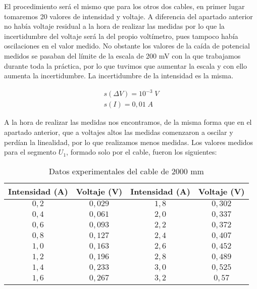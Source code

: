 \documentclass[a4paper,12pt,titlepage]{article}
\begin{document}
El procedimiento será el mismo que para los otros dos cables, en primer lugar tomaremos 20 valores de intensidad y voltaje. A diferencia del apartado anterior no había voltaje residual a la hora de realizar las medidas por lo que la incertidumbre del voltaje será la del propio voltímetro, pues tampoco había oscilaciones en el valor medido. No obstante los valores de la caída de potencial medidos se pasaban del límite de la escala de 200 mV con la que trabajamos durante toda la práctica, por lo que tuvimos que aumentar la escala y con ello aumenta la incertidumbre. La incertidumbre de la intensidad es la misma.

\begin{equation}
    \begin{gathered}
        s(\Delta V) = 10^{-3} \; V \\
        s(I) = 0,01\; A
    \end{gathered}
\end{equation}

A la hora de realizar las medidas nos encontramos, de la misma forma que en el apartado anterior, que a voltajes altos las medidas comenzaron a oscilar y perdían la linealidad, por lo que realizamos menos medidas. Los valores medidos para el segmento $U_{1}$, formado solo por el cable, fueron los siguientes:

\begin{table}[h!]
    \centering
    \begin{tabular}{|c|c|c|c|}
        \hline
        Intensidad (A) & Voltaje (V) & Intensidad (A) & Voltaje (V) \\ \hline
        $0,2$ & $0,029$ & $1,8$ & $0,302$ \\ \hline
        $0,4$ & $0,061$ & $2,0$ & $0,337$ \\ \hline
        $0,6$ & $0,093$ & $2,2$ & $0,372$ \\ \hline
        $0,8$ & $0,127$ & $2,4$ & $0,407$ \\ \hline
        $1,0$ & $0,163$ & $2,6$ & $0,452$ \\ \hline
        $1,2$ & $0,196$ & $2,8$ & $0,489$ \\ \hline
        $1,4$ & $0,233$ & $3,0$ & $0,525$ \\ \hline
        $1,6$ & $0,267$ & $3,2$ & $0,57$ \\ \hline
    \end{tabular}
    \caption{Datos experimentales del cable de 2000 mm}
\end{table}
\end{document}
